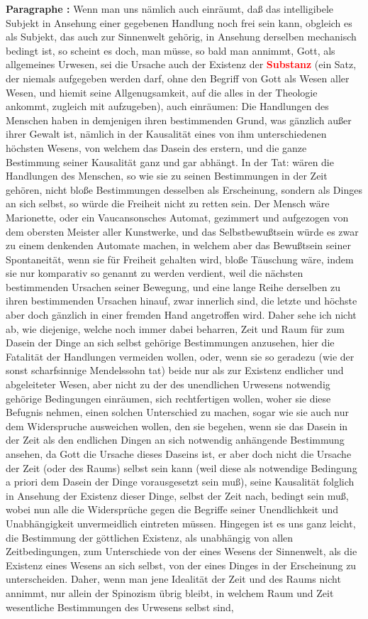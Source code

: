 \documentclass[a4paper,12pt,twoside]{book}
\newcommand{\match}[1]{\textcolor{red}{\textbf{#1}}}
\begin{document}
	\noindent\textbf{Paragraphe : }Wenn man uns nämlich auch einräumt, daß das intelligibele Subjekt in Ansehung einer gegebenen Handlung noch frei sein kann, obgleich es als Subjekt, das auch zur Sinnenwelt gehörig, in Ansehung derselben mechanisch bedingt ist, so scheint es doch, man müsse, so bald man annimmt, Gott, als allgemeines Urwesen, sei die Ursache auch der Existenz der \match{Substanz} (ein Satz, der niemals aufgegeben  werden darf, ohne den Begriff von Gott als Wesen aller Wesen, und hiemit seine Allgenugsamkeit, auf die alles in der Theologie ankommt, zugleich mit aufzugeben), auch einräumen: Die Handlungen des Menschen haben in demjenigen ihren bestimmenden Grund, was gänzlich außer ihrer Gewalt ist, nämlich in der Kausalität eines von ihm unterschiedenen höchsten Wesens, von welchem das Dasein des erstern, und die ganze Bestimmung seiner Kausalität ganz und gar abhängt. In der Tat: wären die Handlungen des Menschen, so wie sie zu seinen Bestimmungen in der Zeit gehören, nicht bloße Bestimmungen desselben als Erscheinung, sondern als Dinges an sich selbst, so würde die Freiheit nicht zu retten sein. Der Mensch wäre Marionette, oder ein Vaucansonsches Automat, gezimmert und aufgezogen von dem obersten Meister aller Kunstwerke, und das Selbstbewußtsein würde es zwar zu einem denkenden Automate machen, in welchem aber das Bewußtsein seiner Spontaneität, wenn sie für Freiheit gehalten wird, bloße Täuschung wäre, indem sie nur komparativ so genannt zu werden verdient, weil die nächsten bestimmenden Ursachen seiner Bewegung, und eine lange Reihe derselben zu ihren bestimmenden Ursachen hinauf, zwar innerlich sind, die letzte und höchste aber doch gänzlich in einer fremden Hand angetroffen wird. Daher sehe ich nicht ab, wie diejenige, welche noch immer dabei beharren, Zeit und Raum für zum Dasein der Dinge an sich selbst gehörige Bestimmungen anzusehen, hier die Fatalität der Handlungen vermeiden wollen, oder, wenn sie so geradezu (wie der sonst scharfsinnige Mendelssohn tat) beide nur als zur Existenz endlicher und abgeleiteter Wesen, aber nicht zu der des unendlichen Urwesens notwendig gehörige Bedingungen einräumen, sich rechtfertigen wollen, woher sie diese Befugnis nehmen, einen solchen Unterschied zu machen, sogar wie sie auch nur dem Widerspruche ausweichen wollen, den sie begehen, wenn sie das Dasein in der Zeit als den endlichen Dingen an sich notwendig anhängende Bestimmung ansehen, da Gott die Ursache dieses Daseins ist, er aber doch nicht die Ursache der Zeit (oder des Raums) selbst sein kann (weil diese als  notwendige Bedingung a priori dem Dasein der Dinge vorausgesetzt sein muß), seine Kausalität folglich in Ansehung der Existenz dieser Dinge, selbst der Zeit nach, bedingt sein muß, wobei nun alle die Widersprüche gegen die Begriffe seiner Unendlichkeit und Unabhängigkeit unvermeidlich eintreten müssen. Hingegen ist es uns ganz leicht, die Bestimmung der göttlichen Existenz, als unabhängig von allen Zeitbedingungen, zum Unterschiede von der eines Wesens der Sinnenwelt, als die Existenz eines Wesens an sich selbst, von der eines Dinges in der Erscheinung zu unterscheiden. Daher, wenn man jene Idealität der Zeit und des Raums nicht annimmt, nur allein der Spinozism übrig bleibt, in welchem Raum und Zeit wesentliche Bestimmungen des Urwesens selbst sind, 
\end{document}
